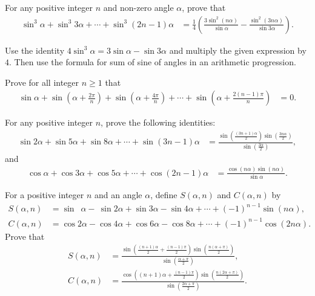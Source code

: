 \documentclass[12pt,a4paper]{memoir}
\theoremstyle{definition}
\begin{document}
\begin{question}
	For any positive integer $n$ and non-zero angle $\alpha$, prove that
	\begin{align*}
		\sin^3\alpha + \sin^3 3\alpha + \cdots + \sin^3(2n-1)\alpha &= \frac{1}{4}\left(\frac{3\sin^2(n\alpha)}{\sin \alpha} - \frac{\sin^2(3n\alpha)}{\sin 3\alpha}\right).
	\end{align*}
\end{question}

\begin{solution}
	Use the identity $4\sin^3\alpha = 3\sin \alpha - \sin 3\alpha$ and multiply the given expression by $4$. Then use the formula for sum of sine of angles in an arithmetic progression.
\end{solution}

\begin{question}
	Prove for all integer $n\geq 1$ that 
	\begin{align*}
		\sin \alpha + \sin\left(\alpha+\frac{2\pi}{n}\right)  + \sin\left(\alpha+\frac{4\pi}{n}\right)  + \cdots + \sin\left(\alpha+\frac{2(n-1)\pi}{n}\right)  &= 0.  
	\end{align*}
\end{question}

\begin{question}
	For any positive integer $n$, prove the following identities:
	\begin{align*}
		\sin 2\alpha + \sin 5\alpha + \sin 8\alpha + \cdots + \sin(3n-1)\alpha &= \frac{\displaystyle\sin\left(\frac{(3n+1)\alpha}{2}\right)\sin\left(\frac{3n\alpha}{2}\right)}{\displaystyle\sin\left(\frac{3\alpha}{2}\right)},
	\end{align*}
	and
	\begin{align*}
		\cos \alpha + \cos 3\alpha + \cos 5\alpha + \cdots + \cos(2n-1)\alpha &= \frac{\cos(n\alpha)\sin(n\alpha)}{\sin \alpha}.
	\end{align*}
\end{question}


\begin{question}
	For a positive integer $n$ and an angle $\alpha$, define $S(\alpha,n)$ and $C(\alpha,n)$ by
	\begin{align*}
		S(\alpha,n) &= \sin \phantom{2}\alpha - \ \sin 2\alpha + \sin 3\alpha -\sin 4\alpha + \cdots + (-1)^{n-1}\sin(n\alpha),\\
		C(\alpha,n) &= \cos 2\alpha - \cos 4\alpha + \cos 6\alpha - \cos 8\alpha + \cdots + (-1)^{n-1}\cos(2n\alpha).
	\end{align*}
	Prove that
	\begin{align*}
		S(\alpha,n) &= \frac{\displaystyle \sin\left(\frac{(n+1)\alpha}{2}+\frac{(n-1)\pi}{2}\right)\sin\left(\frac{n(\alpha+\pi)}{2}\right)}{\displaystyle \sin\left(\frac{\alpha+\pi}{2}\right)},\\
		C(\alpha,n) &= \frac{\displaystyle \cos\left((n+1)\alpha+\frac{(n-1)\pi}{2}\right)\sin\left(\frac{n(2\alpha+\pi)}{2}\right)}{\displaystyle \sin\left(\frac{2\alpha+\pi}{2}\right)}.
	\end{align*}
\end{question}
\end{document}
